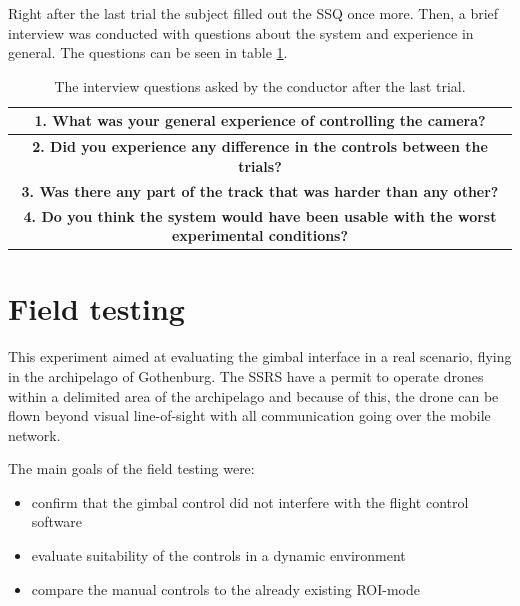 \documentclass[nofilelist]{cslthse-msc}
\begin{document}
Right after the last trial the subject filled out the SSQ once more. Then, a brief interview was conducted with questions about the system and experience in general. The questions can be seen in table \ref{tab:interview-questions}.

\setlength{\extrarowheight}{5pt}
\vspace{10pt}

\begin{table}[!hbt]
   \centering
      \begin{tabular}{|c|}
         \hline
         \textbf{1. What was your general experience of controlling the camera?} \\
         \hline
         \textbf{2. Did you experience any difference in the controls between the trials?} \\
         \hline
         \textbf{3. Was there any part of the track that was harder than any other?} \\
         \hline
         \textbf{4. Do you think the system would have been usable with the worst experimental conditions?} \\
         \hline
      \end{tabular}
   \caption{The interview questions asked by the conductor after the last trial.}
   \label{tab:interview-questions}
\end{table}

\vspace{10pt}

\section{Field testing}
This experiment aimed at evaluating the gimbal interface in a real scenario, flying in the archipelago of Gothenburg. The SSRS have a permit to operate drones within a delimited area of the archipelago and because of this, the drone can be flown beyond visual line-of-sight with all communication going over the mobile network. 

The main goals of the field testing were:
\begin{itemize}
   \item confirm that the gimbal control did not interfere with the flight control software
   \item evaluate suitability of the controls in a dynamic environment
   \item compare the manual controls to the already existing ROI-mode
\end{itemize} 
\end{document}
